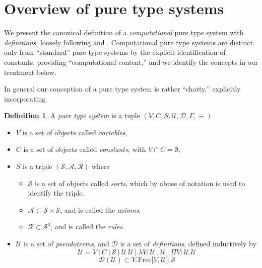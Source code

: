 \documentclass{amsbook}
\DeclareRobustCommand{\#}{\adjustbox{valign=B,totalheight=.57\baselineskip}{\oldhash}}%
\theoremstyle{definition}
\newtheorem{definition}[theorem]{Definition}
\theoremstyle{remark}
\numberwithin{section}{chapter}
\numberwithin{equation}{chapter}
\begin{document}
\section{Overview of pure type systems}

We present the canonical definition of a \emph{computational} pure type system with \emph{definitions}, loosely following \cite{ClassicalPTS97} and \cite{PTSWithDefinitions}. Computational pure type systems are distinct only from ``standard'' pure type systems by the explicit identification of constants, providing ``computational content,'' and we identify the concepts in our treatment below.

In general our conception of a pure type system is rather ``chatty,'' explicitly incorporating 


\begin{definition}
    A \emph{pure type system} is a tuple $(V,C,S,\mathcal{U},\mathcal{D},\Gamma,\equiv)$
    \begin{itemize}
        \item $V$ is a set of objects called \emph{variables},
        \item $C$ is a set of objects called \emph{constants}, with $V \cap C = \emptyset$, 
        \item $S$ is a triple $(\mathcal{S},\mathcal{A},\mathcal{R})$ where
        \begin{itemize}
            \item $\mathcal{S}$ is a set of objects called \emph{sorts}, which by abuse of notation is used to identify the triple. 
            \item $\mathcal{A} \subset \mathcal{S}\times\mathcal{S}$, and is called the \emph{axioms}.
            \item $\mathcal{R} \subset \mathcal{S}^3$, and is called the \emph{rules}.
        \end{itemize}
        \item $\mathcal{U}$ is a set of \emph{pseudoterms}, and $\mathcal{D}$ is a set of \emph{definitions}, defined inductively by 
            \begin{equation*}
                \mathcal{U} = V\ |\ C\ |\ \mathcal{S}\ |\ \mathcal{U}\ \mathcal{U}\ |\ \lambda V : \mathcal{U}\ .\ \mathcal{U}\ |\ \Pi V : \mathcal{U} .\mathcal{U}
            \end{equation*}
            \begin{equation*}
                \mathcal{D}(\mathcal{U}) \subset V . \mathrm{Free} \lbrack V , \mathcal{U} \rbrack : \mathcal{S}

\end{equation*}
\end{itemize}
\end{definition}
\end{document}
